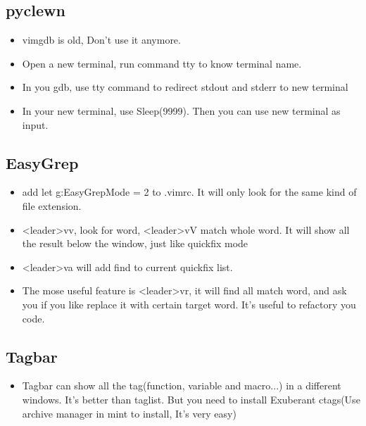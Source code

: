 \documentclass[a4paper,12pt,twoside]{book}
\begin{document}
\begin{itemize}
\subsection{pyclewn}
\begin{itemize}
\item vimgdb is old, Don't use it anymore.
\item Open a new terminal, run command tty to know terminal name.
\item In you gdb, use tty command to redirect stdout and stderr to new terminal
\item In your new terminal, use Sleep(9999). Then you can use new terminal as input. 
\end{itemize}

\subsection{EasyGrep}
\begin{itemize}
		\item add let g:EasyGrepMode = 2 to .vimrc. It will only look for the same kind of file extension. 
		\item <leader>vv, look for word,  <leader>vV match whole word. It will show all the result below the window, just like quickfix mode
		\item <leader>va will add find to current quickfix list. 
		\item The mose useful feature is <leader>vr, it will find all match word, and ask you if you like replace it with certain target word. It's useful to refactory you code. 
\end{itemize}

\subsection{Tagbar}
\begin{itemize}
\item Tagbar can show all the tag(function, variable and macro...) in a different windows. It's better than taglist. But you need to install Exuberant ctags(Use archive manager in mint to install, It's very easy)


\end{itemize}
\end{itemize}
\end{document}
